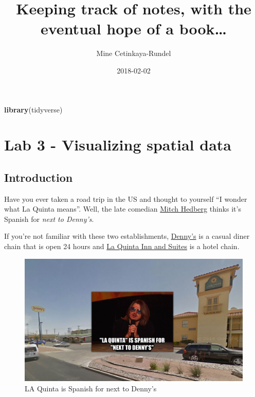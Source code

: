 \documentclass[]{book}
\title{Keeping track of notes, with the eventual hope of a book\ldots{}}
\author{Mine Cetinkaya-Rundel}
\date{2018-02-02}
\newenvironment{Shaded}{\begin{snugshade}}{\end{snugshade}}
\newcommand{\KeywordTok}[1]{\textcolor[rgb]{0.13,0.29,0.53}{\textbf{#1}}}
\newcommand{\NormalTok}[1]{#1}
\theoremstyle{definition}
\theoremstyle{definition}
\theoremstyle{definition}
\theoremstyle{remark}
\begin{document}
\maketitle

{
\setcounter{tocdepth}{1}
\tableofcontents
}
\begin{Shaded}
\begin{Highlighting}[]
\KeywordTok{library}\NormalTok{(tidyverse)}
\end{Highlighting}
\end{Shaded}

\chapter{Lab 3 - Visualizing spatial
data}\label{lab-3---visualizing-spatial-data}

\section{Introduction}\label{introduction}

Have you ever taken a road trip in the US and thought to yourself ``I
wonder what La Quinta means''. Well, the late comedian
\href{https://en.wikipedia.org/wiki/Mitch_Hedberg}{Mitch Hedberg} thinks
it's Spanish for \emph{next to Denny's}.

If you're not familiar with these two establishments,
\href{https://www.dennys.com/}{Denny's} is a casual diner chain that is
open 24 hours and \href{http://www.lq.com/}{La Quinta Inn and Suites} is
a hotel chain.

\begin{figure}
\centering
\includegraphics{img/03-viz-sp-data/mitch-hedgeberg-lqd.jpg}
\caption{LA Quinta is Spanish for next to Denny's}
\end{figure}
\end{document}
